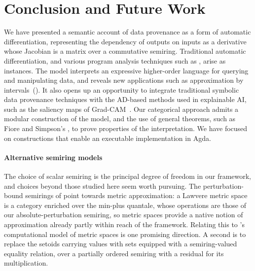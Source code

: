 \section{Conclusion and Future Work}
\label{sec:conclusion}

We have presented a semantic account of data provenance as a form of automatic differentiation, representing
the dependency of outputs on inputs as a derivative whose Jacobian is a matrix over a commutative semiring.
Traditional automatic differentiation, and various program analysis techniques such as \GPS, arise as
instances. The model interprets an expressive higher-order language for querying and manipulating data, and
reveals new applications such as approximation by intervals~().
It also opens up an opportunity to integrate traditional symbolic data provenance techniques with the AD-based
methods used in explainable AI, such as the saliency maps of Grad-CAM~\cite{selvaraju20}. Our categorical
approach admits a modular construction of the model, and the use of general theorems, such as Fiore and
Simpson's , to prove properties of the interpretation. We have focused on
constructions that enable an executable implementation in Agda.

\paragraph{Alternative semiring models}

The choice of scalar semiring is the principal degree of freedom in our framework, and choices
beyond those studied here seem worth pursuing. The perturbation-bound semirings of
 point towards metric approximation: a Lawvere metric space is a
category enriched over the min-plus quantale, whose operations are those of our absolute-perturbation
semiring, so metric spaces provide a native notion of approximation already partly within reach of the
framework. Relating this to \citet{edalat-heckmann98}'s computational model of metric spaces is one promising
direction. A second is to replace the setoids carrying values with sets equipped with a semiring-valued
equality relation, over a partially ordered semiring with a residual for its multiplication.


